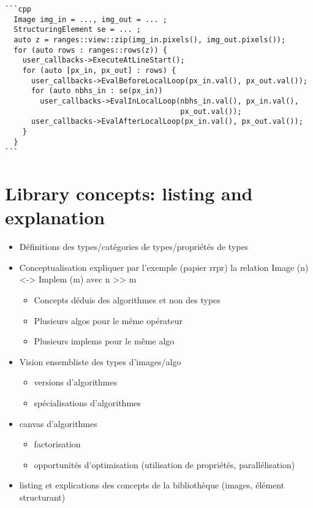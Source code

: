 \begin{verbatim}
```cpp
  Image img_in = ..., img_out = ... ;
  StructuringElement se = ... ;
  auto z = ranges::view::zip(img_in.pixels(), img_out.pixels());
  for (auto rows : ranges::rows(z)) {
    user_callbacks->ExecuteAtLineStart();
    for (auto [px_in, px_out] : rows) {
      user_callbacks->EvalBeforeLocalLoop(px_in.val(), px_out.val());
      for (auto nbhs_in : se(px_in))
        user_callbacks->EvalInLocalLoop(nbhs_in.val(), px_in.val(),
                                        px_out.val());
      user_callbacks->EvalAfterLocalLoop(px_in.val(), px_out.val());
    }
  }
```
\end{verbatim}

\chapter{Library concepts: listing and explanation}

\clearpage

\begin{itemize}
  \item Définitions des types/catégories de types/propriétés de types
  \item Conceptualisation expliquer par l'exemple (papier rrpr) la relation Image (n) <-> Implem (m) avec n >> m
        \begin{itemize}
          \item Concepts déduis des algorithmes et non des types
          \item Plusieurs algos pour le même opérateur
          \item Plusieurs implems pour le même algo
        \end{itemize}
  \item Vision ensembliste des types d'images/algo
        \begin{itemize}
          \item versions d'algorithmes
          \item spécialisations d'algorithmes
        \end{itemize}
  \item canvas d'algorithmes
        \begin{itemize}
          \item factorisation
          \item opportunités d'optimisation (utilisation de propriétés, parallélisation)
        \end{itemize}
  \item listing et explications des concepts de la bibliothèque (images, élément structurant)
\end{itemize}